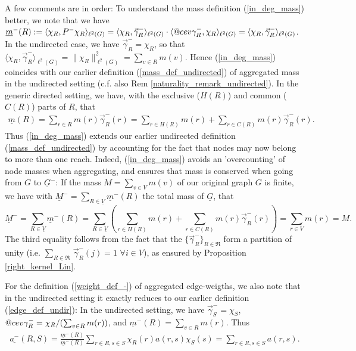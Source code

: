 \documentclass[reqno,12pt,letterpaper]{amsart}
\makeatletter
\numberwithin{equation}{section}
\DeclareRobustCommand{\cev}[1]{%
	\mathpalette\do@cev{#1}%
}
\newcommand{\do@cev}[2]{%
	\fix@cev{#1}{+}%
	\reflectbox{$\m@th#1\vec{\reflectbox{$\fix@cev{#1}{-}\m@th#1#2\fix@cev{#1}{+}$}}$}%
	\fix@cev{#1}{-}%
}
\newcommand{\fix@cev}[2]{%
	\ifx#1\displaystyle
	\mkern#23mu
	\else
	\ifx#1\textstyle
	\mkern#23mu
	\else
	\ifx#1\scriptstyle
	\mkern#22mu
	\else
	\mkern#22mu
	\fi
	\fi
	\fi
}
\newcommand{\1}{\mathds{1}}
\theoremstyle{definition}
\makeatother
\begin{document}
A few comments are in order: To understand the mass definition (\ref{in_deg_mass}) better, we note
 that we have
$
\underline{m}^-(R) := \langle  \chi_R ,P^-  \chi_R  \rangle_{\ell^2(G)}
			=	\langle  \chi_R , \vec\gamma^{-}_{R}   \rangle_{\ell^2(G)}  
			\cdot
				\langle \cev\gamma^{-}_{R}, \chi_R \rangle_{\ell^2(G)}
			=	\langle  \chi_R , \vec\gamma^{-}_{R}   \rangle_{\ell^2(G)}  
$.
In the undirected case, we have $\vec\gamma^{-}_{R} = \chi_R$, so that $	\langle  \chi_R , \vec\gamma^{-}_{R}   \rangle_{\ell^2(G)}  = \|\chi_R\|^2_{\ell^2(G)} =  \sum_{v \in R} m(v)$. Hence  (\ref{in_deg_mass}) coincides with our earlier definition  (\ref{mass_def_undirected}) of aggregated mass in the undirected setting (c.f. also Rem \ref{naturality_remark_undirected}). 
 In the generic directed setting, we have,  with the exclusive ($H(R)$) and common ($C(R)$) parts of $R$, that  
	\begin{align}
		\underline{m}(R) = \sum\limits_{r \in R} m(r)  \vec\gamma^{-}_{R}(r) = \sum\limits_{r \in H(R)} m(r) + \sum\limits_{r \in C(R)} m(r)   \vec\gamma^{-}_{R}(r).
	\end{align}
Thus (\ref{in_deg_mass}) extends our earlier undirected definition (\ref{mass_def_undirected}) by accounting for the fact that nodes may now belong to more than one reach. Indeed, (\ref{in_deg_mass}) avoids an 'overcounting' of node masses when aggregating, and ensures that mass is conserved when going from $G$ to $\underline{G}^-$: If the mass $M = \sum_{v \in V} m(v)$ of our original graph $G$ is finite, we have with $\underline{M}^- = \sum_{R \in \underline{V}} \underline{m}^-(R)$ the total mass of $\underline{G}$, that
	\begin{equation}
		\underline{M}^- = \sum\limits_{R \in \underline{V}} \underline{m}^-(R) 
		=
		 \sum\limits_{R \in \underline{V}}
		 \left(
		 \sum\limits_{r \in H(R)} m(r) + \sum\limits_{r \in C(R)} m(r)   \vec\gamma^{-}_{R}(r)
		 \right) 
 		= \sum\limits_{r \in V} m(r)
		= M.
	\end{equation}
	The third equality follows from the fact that the $\{\vec\gamma^{-}_{R}\}_{R \in \mathfrak{R}}$ form a partition of unity (i.e. $	\sum_{R \in \mathfrak{R}}\,	\vec\gamma^{-}_{R}(j) = 1$ $\forall i \in V$),
	as ensured by Proposition \ref{right_kernel_Lin}.	
	
		\medskip


For the definition (\ref{weight_def_-}) of aggregated edge-weigths, we also note that in the undirected setting it exactly reduces to our earlier definition (\ref{edge_def_undir}): In the undirected setting, we have $	\vec{\gamma}^{-}_{S} = \chi_S$, $	\cev{\gamma}_R^{-}= \chi_R/(\sum_{v \in R} m(r))$, and $\underline{m}^{-}(R) = \sum_{v \in R} m(r)$. Thus
		\begin{align}
	\underline{a^-}(R, S) 
	= \frac{ \underline{m}^-(R)}{ \underline{m}^-(R)}	\sum\limits_{r \in R, s \in S} 
\chi_{R}(r)
	a(r,s)
\chi_S(s) 
= 
	\sum\limits_{r \in R, s \in S} 
a(r,s).
\end{align}
\end{document}
